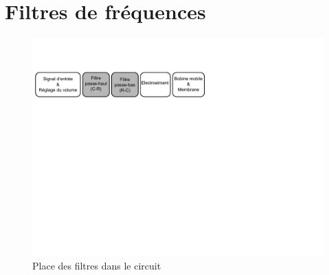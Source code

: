 \chapter{Filtres de fréquences}

\begin{figure}[h!]
\includegraphics[width=\textwidth]{img/Schemabloc2}
\caption{Place des filtres dans le circuit}
\label{fig:schema-gen-filtres}
\end{figure}







